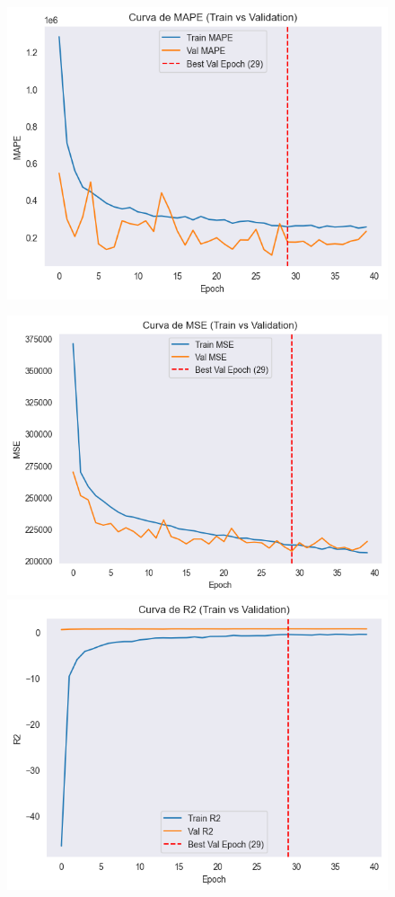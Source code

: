 \begin{figure}[H]
\begin{minipage}{0.48\textwidth}
		\includegraphics[width=\linewidth]{includes/cap5/graphs/sid5_trafficformer_mape.png}
	\end{minipage}
	\hfill
	\begin{minipage}{0.48\textwidth}
		\centering
		\includegraphics[width=\linewidth]{includes/cap5/graphs/sid5_trafficformer_mse.png}
		\vspace{0.2cm}
		\includegraphics[width=\linewidth]{includes/cap5/graphs/sid5_trafficformer_r2.png}

\end{minipage}
\end{figure}
